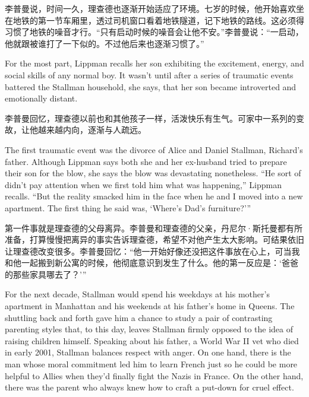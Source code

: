 \ifdefined\chs
李普曼说，时间一久，理查德也逐渐开始适应了环境。七岁的时候，他开始喜欢坐在地铁的第一节车厢里，透过司机窗口看着地铁隧道，记下地铁的路线。这必须得习惯了地铁的噪音才行。“只有启动时候的噪音会让他不安。”李普曼说：“一启动，他就跟被谁打了一下似的。不过他后来也逐渐习惯了。”
\fi

\ifdefined\eng
For the most part, Lippman recalls her son exhibiting the excitement, energy, and social skills of any normal boy. It wasn't until after a series of traumatic events battered the Stallman household, she says, that her son became introverted and emotionally distant.
\fi

\ifdefined\chs
李普曼回忆，理查德以前也和其他孩子一样，活泼快乐有生气。可家中一系列的变故，让他越来越内向，逐渐与人疏远。
\fi

\ifdefined\eng
The first traumatic event was the divorce of Alice and Daniel Stallman, Richard's father. Although Lippman says both she and her ex-husband tried to prepare their son for the blow, she says the blow was devastating nonetheless. ``He sort of didn't pay attention when we first told him what was happening,'' Lippman recalls. ``But the reality smacked him in the face when he and I moved into a new apartment. The first thing he said was, `Where's Dad's furniture?'\hspace{0.01in}''
\fi

\ifdefined\chs
第一件事就是理查德的父母离异。李普曼和理查德的父亲，丹尼尔·斯托曼都有所准备，打算慢慢把离异的事实告诉理查德，希望不对他产生太大影响。可结果依旧让理查德改变很多。李普曼回忆：“他一开始好像还没把这件事放在心上，可当我和他一起搬到新公寓的时候，他彻底意识到发生了什么。他的第一反应是：‘爸爸的那些家具哪去了？’”
\fi

\ifdefined\eng
For the next decade, Stallman would spend his weekdays at his mother's apartment in Manhattan and his weekends at his father's home in Queens. The shuttling back and forth gave him a chance to study a pair of contrasting parenting styles that, to this day, leaves Stallman firmly opposed to the idea of raising children himself. Speaking about his father, a World War II vet who died in early 2001, Stallman balances respect with anger. On one hand, there is the man whose moral commitment led him to learn French just so he could be more helpful to Allies when they'd finally fight the Nazis in France. On the other hand, there was the parent who always knew how to craft a put-down for cruel effect.
\fi

